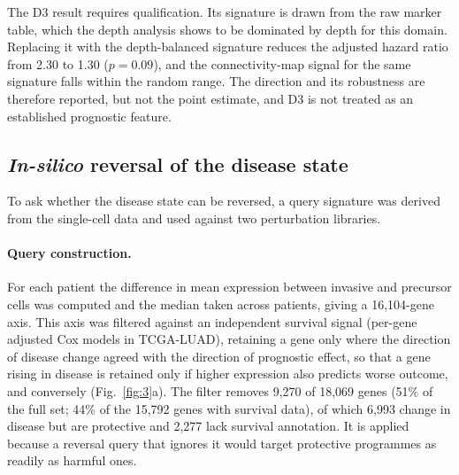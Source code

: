 The D3 result requires qualification. Its signature is drawn from the raw marker table,
which the depth analysis shows to be dominated by depth for this domain. Replacing it with
the depth-balanced signature reduces the adjusted hazard ratio from 2.30 to 1.30
($p=0.09$), and the connectivity-map signal for the same signature falls within the random
range. The direction and its robustness are therefore reported, but not the point estimate,
and D3 is not treated as an established prognostic feature.

\subsection{\emph{In-silico} reversal of the disease state}

To ask whether the disease state can be reversed, a query signature was derived from the
single-cell data and used against two perturbation libraries.

\paragraph{Query construction.} For each patient the difference in mean expression between
invasive and precursor cells was computed and the median taken across patients, giving a
16,104-gene axis. This axis was filtered against an independent survival signal (per-gene
adjusted Cox models in TCGA-LUAD), retaining a gene only where the direction of disease
change agreed with the direction of prognostic effect, so that a gene rising in disease is
retained only if higher expression also predicts worse outcome, and conversely
(Fig.~\ref{fig:3}a). The filter removes 9,270 of 18,069 genes (51\% of the full set; 44\% of
the 15,792 genes with survival data), of which 6,993 change in disease but are protective
and 2,277 lack survival annotation. It is applied because a reversal query that ignores it
would target protective programmes as readily as harmful ones.

